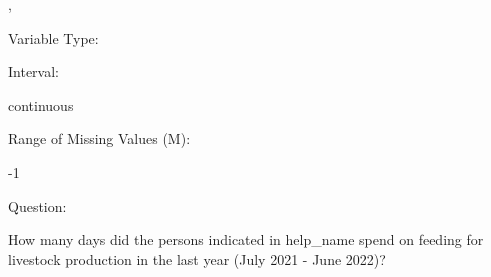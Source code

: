 \documentclass[
]{article}
\begin{document}
,

\begin{minipage}[t]{0.3\linewidth}

\colorbox{mypink1}{}

\end{minipage}%
\begin{minipage}[t]{0.7\linewidth}

\colorbox{mypink1}{\makebox[\textwidth]{\strut\bfseries\color{black}  
 }}

\end{minipage}

\begin{minipage}[t]{0.3\linewidth}

Variable Type:

\end{minipage}%
\begin{minipage}[t]{0.7\linewidth}

\end{minipage}

\begin{minipage}[t]{0.3\linewidth}

Interval:

\end{minipage}%
\begin{minipage}[t]{0.7\linewidth}

continuous

\end{minipage}

\begin{minipage}[t]{0.3\linewidth}

Range of Missing Values (M):

\end{minipage}%
\begin{minipage}[t]{0.7\linewidth}

-1

\end{minipage}

\begin{minipage}[t]{0.3\linewidth}

Question:

\end{minipage}%
\begin{minipage}[t]{0.7\linewidth}

How many days did the persons indicated in help\_name spend on feeding
for livestock production in the last year (July 2021 - June 2022)?

\end{minipage}
\end{document}
